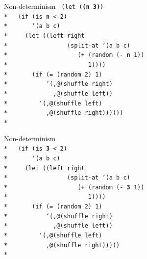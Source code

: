 \documentclass{beamer}
\begin{document}
\begin{frame}{Non-determinism}
  \texttt{
    (let (\textbf{(n 3)})\\*
    \ \ (if (is \textbf{n} < 2)\\*
    \ \ \ \ \ \ '(a b c)\\*
    \ \ \ \ (let ((left right\\*
    \ \ \ \ \ \ \ \ \ \ \ \ \ \ \ \ (split-at '(a b c)\\*
    \ \ \ \ \ \ \ \ \ \ \ \ \ \ \ \ \ \ \ (+ (random (- \textbf{n} 1))\\*
    \ \ \ \ \ \ \ \ \ \ \ \ \ \ \ \ \ \ \ \ \ \ 1))))\\*
    \ \ \ \ \ \ (if (= (random 2) 1)\\*
    \ \ \ \ \ \ \ \ \ \ `(,@(shuffle right)\\*
    \ \ \ \ \ \ \ \ \ \ \ \ ,@(shuffle left))\\*
    \ \ \ \ \ \ \ \ `(,@(shuffle left)\\*
    \ \ \ \ \ \ \ \ \ \ ,@(shuffle right))))))\\*
    \ 
    }
\end{frame}


\begin{frame}{Non-determinism}
  \texttt{
    \ \\*
    \ \ (if (is \textbf{3} < 2)\\*
    \ \ \ \ \ \ '(a b c)\\*
    \ \ \ \ (let ((left right\\*
    \ \ \ \ \ \ \ \ \ \ \ \ \ \ \ \ (split-at '(a b c)\\*
    \ \ \ \ \ \ \ \ \ \ \ \ \ \ \ \ \ \ \ (+ (random (- \textbf{3} 1))\\*
    \ \ \ \ \ \ \ \ \ \ \ \ \ \ \ \ \ \ \ \ \ \ 1))))\\*
    \ \ \ \ \ \ (if (= (random 2) 1)\\*
    \ \ \ \ \ \ \ \ \ \ `(,@(shuffle right)\\*
    \ \ \ \ \ \ \ \ \ \ \ \ ,@(shuffle left))\\*
    \ \ \ \ \ \ \ \ `(,@(shuffle left)\\*
    \ \ \ \ \ \ \ \ \ \ ,@(shuffle right)))))\\*
    \ 
    }
\end{frame}
\end{document}
